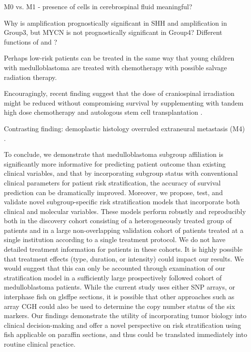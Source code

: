 M0 vs. M1 - presence of cells in cerebrospinal fluid meaningful?

Why is  amplification prognostically significant in SHH and  amplification in Group3, but MYCN is not prognostically significant in Group4? Different functions of  and ?

Perhaps low-risk patients can be treated in the same way that young children with medulloblastoma are treated with chemotherapy with possible salvage radiation therapy.

Encouragingly, recent finding suggest that the dose of craniospinal irradiation might be reduced without compromising survival by supplementing with tandem high dose chemotherapy and autologous stem cell transplantation .

Contrasting finding: demoplastic histology overruled extraneural metastasis (M4) .


To conclude, we demonstrate that medulloblastoma subgroup affiliation is significantly more informative for predicting patient outcome than existing clinical variables, and that by incorporating subgroup status with conventional clinical parameters for patient risk stratification, the accuracy of survival prediction can be dramatically improved.  Moreover, we propose, test, and validate novel subgroup-specific risk stratification models that incorporate both clinical and molecular variables.  These models perform robustly and reproducibly both in the discovery cohort consisting of a heterogeneously treated group of patients and in a large non-overlapping validation cohort of patients treated at a single institution according to a single treatment protocol.  We do not have detailed treatment information for patients in these cohorts.  It is highly possible that treatment effects (type, duration, or intensity) could impact our results.  We would suggest that this can only be accounted through examination of our stratification model in a sufficiently large prospectively followed cohort of medulloblastoma patients.  While the current study uses either SNP arrays, or interphase \gls{fish} on gls{ffpe} sections, it is possible that other approaches such as array CGH could also be used to determine the copy number status of the six markers.  Our findings demonstrate the utility of incorporating tumor biology into clinical decision-making and offer a novel perspective on risk stratification using \gls{fish} applicable on paraffin sections, and thus could be translated immediately into routine clinical practice.
